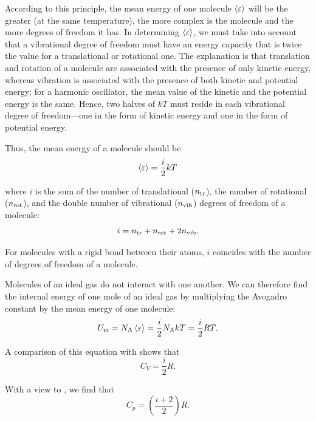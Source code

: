 According to this principle, the mean energy of one molecule $\left\langle \varepsilon \right\rangle$ will be the greater (at the same temperature), the more complex is the molecule and the more degrees of freedom it has. In determining $\left\langle \varepsilon \right\rangle$, we must take into account that a vibrational degree of freedom must have an energy capacity that is twice the value for a translational or rotational one. The explanation is that translation and rotation of a molecule are associated with the presence of only kinetic energy, whereas vibration is associated with the presence of both kinetic and potential energy; for a harmonic oscillator, the mean value of the kinetic and the potential energy is the same. Hence, two halves of $kT$ must reside in each vibrational degree of freedom---one in the form of kinetic energy and one in the form of potential energy.

Thus, the mean energy of a molecule should be
\begin{equation}\label{eq:11_34}
	\left\langle \varepsilon \right\rangle = \frac{i}{2}kT
\end{equation}

\noindent
where $i$ is the sum of the number of translational ($n_{\text{tr}}$), the number of rotational ($n_{\text{rot}}$), and the double number of vibrational ($n_{\text{vib}}$) degrees of freedom of a molecule:
\vspace{-12pt}
\begin{equation}\label{eq:11_35}
	i = n_{\text{tr}} + n_{\text{rot}} + 2n_{\text{vib}}.
\end{equation}

\noindent
For molecules with a rigid bond between their atoms, $i$ coincides with the number of degrees of freedom of a molecule.

Molecules of an ideal gas do not interact with one another. We can therefore find the internal energy of one mole of an ideal gas by multiplying the Avogadro constant by the mean energy of one molecule:
\begin{equation}\label{eq:11_36}
	U_{\text{m}} = N_{\text{A}}\left\langle \varepsilon \right\rangle = \frac{i}{2}N_{\text{A}} kT = \frac{i}{2}RT.
\end{equation}

\noindent
A comparison of this equation with  shows that
\begin{equation}\label{eq:11_37}
	C_V = \frac{i}{2}R.
\end{equation}

\noindent
With a view to , we find that
\begin{equation}\label{eq:11_38}
	C_p = \left(\frac{i+2}{2}\right) R.
\end{equation}

